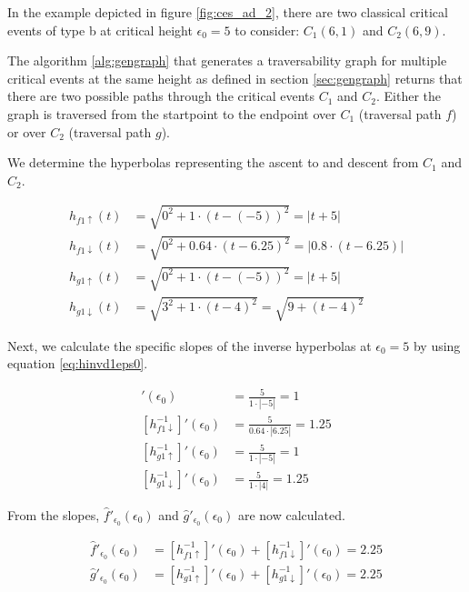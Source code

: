 In the example depicted in figure \ref{fig:ces_ad_2}, there are two classical critical events of type b at critical height $\epsilon_0 = 5$ to consider: $C_1(6, 1)$ and $C_2(6, 9)$.

The algorithm \ref{alg:gengraph} that generates a traversability graph for multiple critical events at the same height as defined in section \ref{sec:gengraph} returns that there are two possible paths through the critical events $C_1$ and $C_2$. Either the graph is traversed from the startpoint to the endpoint over $C_1$ (traversal path $f$) or over $C_2$ (traversal path $g$).

We determine the hyperbolas representing the ascent to and descent from $C_1$ and $C_2$.

\begin{align*}
	h_{f1\uparrow}(t) &= \sqrt{0^2 + 1\cdot(t - (-5))^2} = \left| t + 5 \right|\\
	h_{f1\downarrow}(t) &= \sqrt{0^2 + 0.64\cdot(t - 6.25)^2} = \left| 0.8\cdot(t - 6.25) \right|\\
	h_{g1\uparrow}(t) &= \sqrt{0^2 + 1\cdot(t - (-5))^2} = \left| t + 5 \right|\\
	h_{g1\downarrow}(t) &= \sqrt{3^2 + 1\cdot(t - 4)^2} = \sqrt{9 + (t - 4)^2}
\end{align*}

Next, we calculate the specific slopes of the inverse hyperbolas at $\epsilon_0 = 5$ by using equation \ref{eq:hinvd1eps0}.

\begin{align*}
	[h_{f1\uparrow}^{-1}]'(\epsilon_0) &= \frac{5}{1\cdot\left|-5\right|} = 1\\
	[h_{f1\downarrow}^{-1}]'(\epsilon_0) &= \frac{5}{0.64\cdot\left|6.25\right|} = 1.25\\
	[h_{g1\uparrow}^{-1}]'(\epsilon_0) &= \frac{5}{1\cdot\left|-5\right|} = 1\\
	[h_{g1\downarrow}^{-1}]'(\epsilon_0) &= \frac{5}{1\cdot\left|4\right|} = 1.25 
\end{align*}

From the slopes, $\hat{f}'_{\epsilon_0}(\epsilon_0)$ and $\hat{g}'_{\epsilon_0}(\epsilon_0)$ are now calculated.

\begin{align*}
	\hat{f}'_{\epsilon_0}(\epsilon_0) &= [h_{f1\uparrow}^{-1}]'(\epsilon_0) + [h_{f1\downarrow}^{-1}]'(\epsilon_0) = 2.25\\
	\hat{g}'_{\epsilon_0}(\epsilon_0) &= [h_{g1\uparrow}^{-1}]'(\epsilon_0) + [h_{g1\downarrow}^{-1}]'(\epsilon_0) = 2.25\\
\end{align*}

